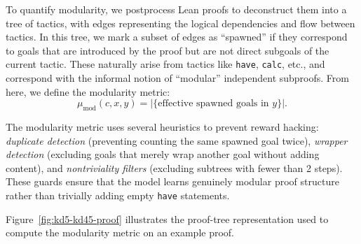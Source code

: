 To quantify modularity, we postprocess Lean proofs to deconstruct them into a tree of tactics, with edges representing the logical dependencies and flow between tactics. In this tree, we mark a subset of edges as ``spawned'' if they correspond to goals that are introduced by the proof but are not direct subgoals of the current tactic. These naturally arise from tactics like \texttt{have}, \texttt{calc}, etc., and correspond with the informal notion of ``modular'' independent subproofs. From here, we define the modularity metric:
\[
\mu_{\mathrm{mod}}(c, x, y) = |\{\text{effective spawned goals in } y\}|.
\]

The modularity metric uses several heuristics to prevent reward hacking: \emph{duplicate detection} (preventing counting the same spawned goal twice), \emph{wrapper detection} (excluding goals that merely wrap another goal without adding content), and \emph{nontriviality filters} (excluding subtrees with fewer than 2 steps). These guards ensure that the model learns genuinely modular proof structure rather than trivially adding empty \texttt{have} statements.

Figure~\ref{fig:kd5-kd45-proof} illustrates the proof-tree representation used to compute the modularity metric on an example proof.

